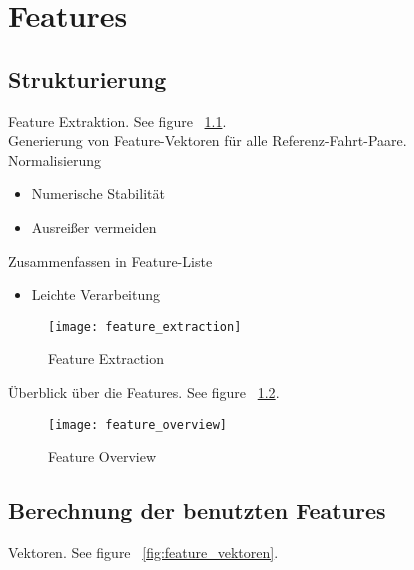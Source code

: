 
\chapter{Features} %
\label{cha:Features}

\section{Strukturierung} %
\label{sec:Strukturierung}
Feature Extraktion. See figure ~\ref{fig:feature_extraction}.\\

Generierung von Feature-Vektoren für alle Referenz-Fahrt-Paare.\\

Normalisierung
\begin{itemize}
\item Numerische Stabilität
\item Ausreißer vermeiden
\end{itemize}

Zusammenfassen in Feature-Liste
\begin{itemize}
\item Leichte Verarbeitung
\end{itemize}

\begin{figure}[htbp]
\begin{center}
\texttt{[image: feature\_extraction]}
\caption{Feature Extraction}
\label{fig:feature_extraction}
\end{center}
\end{figure}

Überblick über die Features. See figure ~\ref{fig:feature_overview}.\\

\begin{figure}[htbp]
\begin{center}
\texttt{[image: feature\_overview]}
\caption{Feature Overview}
\label{fig:feature_overview}
\end{center}
\end{figure}


\section{Berechnung der benutzten Features} %
\label{sec:Berechnung_der_benutzten_Features}
Vektoren. See figure ~\ref{fig:feature_vektoren}.\\

